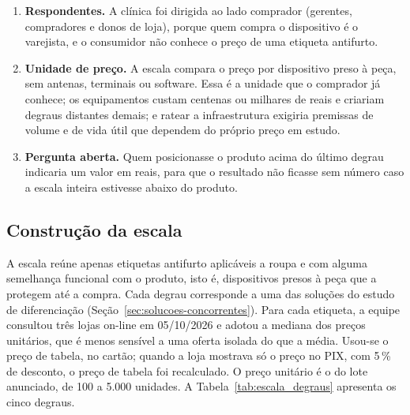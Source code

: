 \begin{enumerate}[label=\alph*)]
  \item \textbf{Respondentes.} A clínica foi dirigida ao lado comprador (gerentes, compradores e donos de loja), porque quem compra o dispositivo é o varejista, e o consumidor não conhece o preço de uma etiqueta antifurto.
  \item \textbf{Unidade de preço.} A escala compara o preço por dispositivo preso à peça, sem antenas, terminais ou software. Essa é a unidade que o comprador já conhece; os equipamentos custam centenas ou milhares de reais e criariam degraus distantes demais; e ratear a infraestrutura exigiria premissas de volume e de vida útil que dependem do próprio preço em estudo.
  \item \textbf{Pergunta aberta.} Quem posicionasse o produto acima do último degrau indicaria um valor em reais, para que o resultado não ficasse sem número caso a escala inteira estivesse abaixo do produto.
\end{enumerate}

\subsection{Construção da escala}
\label{subsec:escala_construcao}

A escala reúne apenas etiquetas antifurto aplicáveis a roupa e com alguma semelhança funcional com o produto, isto é, dispositivos presos à peça que a protegem até a compra. Cada degrau corresponde a uma das soluções do estudo de diferenciação (Seção~\ref{sec:solucoes-concorrentes}). Para cada etiqueta, a equipe consultou três lojas on-line em 05/10/2026 e adotou a mediana dos preços unitários, que é menos sensível a uma oferta isolada do que a média. Usou-se o preço de tabela, no cartão; quando a loja mostrava só o preço no PIX, com 5\,\% de desconto, o preço de tabela foi recalculado. O preço unitário é o do lote anunciado, de 100 a 5.000 unidades. A Tabela~\ref{tab:escala_degraus} apresenta os cinco degraus.

